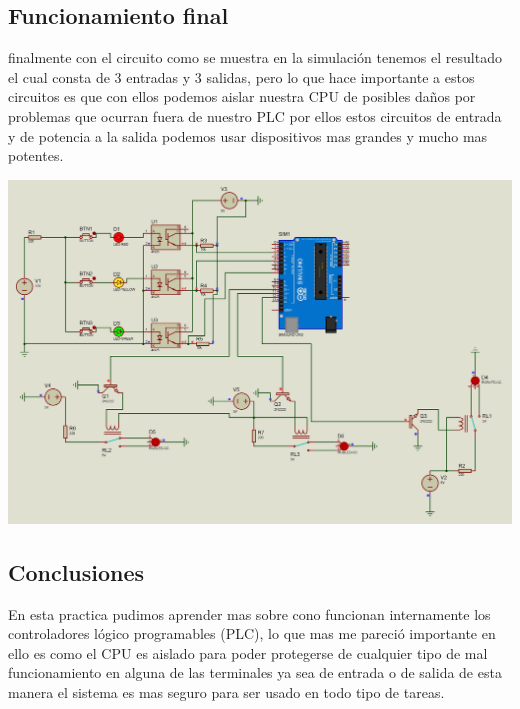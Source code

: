 \documentclass[12pt,a4paper]{article}
\begin{document}
\subsection{Funcionamiento final}
\begin{flushleft}
finalmente con el circuito como se muestra en la simulación tenemos el resultado el cual consta de 3 entradas y 3 salidas, pero lo que hace importante a estos circuitos es que con ellos podemos aislar nuestra CPU de posibles daños por problemas que ocurran fuera de nuestro PLC por ellos estos circuitos de entrada y de potencia a la salida podemos usar dispositivos mas grandes y mucho mas potentes. 
\linebreak
\linebreak
\end{flushleft}
\includegraphics[scale=0.15]{imagenes/simu0.JPG}
\newpage
\subsection{Conclusiones}
\begin{flushleft}
En esta practica pudimos aprender mas sobre cono funcionan internamente los controladores lógico programables (PLC), lo que mas me pareció importante en ello es como el CPU es aislado para poder protegerse de cualquier tipo de mal funcionamiento en alguna de las terminales ya sea de entrada o de salida de esta manera el sistema es mas seguro para ser usado en todo tipo de tareas.
\end{flushleft}
\end{document}
